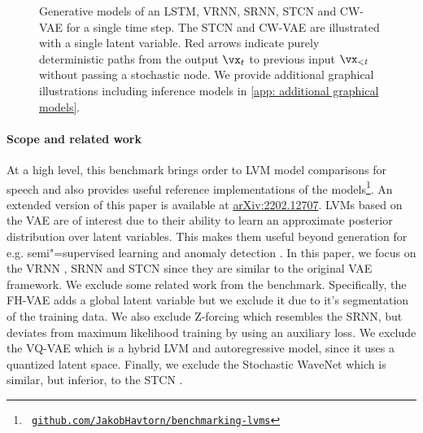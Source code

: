 {\begin{figure*}[t!]
\begin{multicols}{5}
{
    }
    \end{multicols}
\caption{
Generative models of an LSTM, VRNN, SRNN, STCN and CW-VAE for a single time step. The STCN and CW-VAE are illustrated with a single latent variable. 
Red arrows indicate purely deterministic paths from the output $\vx_t$ to previous input $\vx_{<t}$ without passing a stochastic node. 
We provide additional graphical illustrations including inference models in \cref{app: additional graphical models}.
}
\label{fig: autoregressive vrnn srnn cwvae 1L graphs}
\end{figure*}

\paragraph{Scope and related work} 
At a high level, this benchmark brings order to LVM model comparisons for speech and also provides useful reference implementations of the models\footnote{\texttt{ \href{https://github.com/JakobHavtorn/benchmarking-lvms}{github.com/JakobHavtorn/benchmarking-lvms}}}. 
An extended version of this paper is available at \href{https://arxiv.org/abs/2202.12707}{arXiv:2202.12707}.
LVMs based on the VAE are of interest due to their ability to learn an approximate posterior distribution over latent variables. This makes them useful beyond generation for e.g. semi"=supervised learning \parencite{kingma_semi-supervised_2014} and anomaly detection \parencite{havtorn_hierarchical_2021}. 
In this paper, we focus on the VRNN \parencite{chung_recurrent_2015}, SRNN \parencite{fraccaro_sequential_2016} and STCN \parencite{aksan_stcn_2019} since they are similar to the original VAE framework. 
We exclude some related work from the benchmark. Specifically, the FH-VAE \parencite{hsu_unsupervised_2017} adds a global latent variable but we exclude it due to it's segmentation of the training data. We also exclude Z-forcing \parencite{goyal_zforcing_2017} which resembles the SRNN, but deviates from maximum likelihood training by using an auxiliary loss. We exclude the VQ-VAE \parencite{oord_neural_2018} which is a hybrid LVM and autoregressive model, since it uses a quantized latent space. Finally, we exclude the Stochastic WaveNet \parencite{lai_stochastic_2018} which is similar, but inferior, to the STCN \parencite{aksan_stcn_2019}.

}
